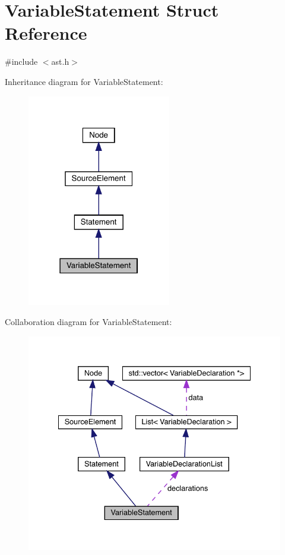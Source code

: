 \hypertarget{struct_variable_statement}{}\section{Variable\+Statement Struct Reference}
\label{struct_variable_statement}


{\ttfamily \#include $<$ast.\+h$>$}



Inheritance diagram for Variable\+Statement\+:
\nopagebreak
\begin{figure}[H]
\begin{center}
\leavevmode
\includegraphics[width=178pt]{struct_variable_statement__inherit__graph}
\end{center}
\end{figure}


Collaboration diagram for Variable\+Statement\+:
\nopagebreak
\begin{figure}[H]
\begin{center}
\leavevmode
\includegraphics[width=335pt]{struct_variable_statement__coll__graph}
\end{center}
\end{figure}
